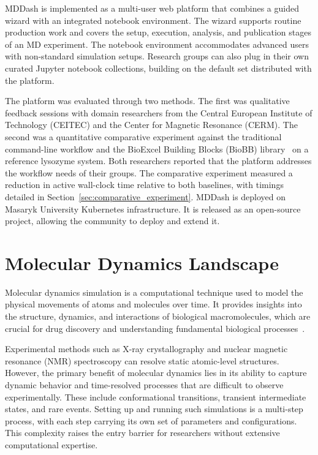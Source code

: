 \documentclass[
  digital,     %
  color,       %
  oneside,     %
  nosansbold,  %
  nocolorbold, %
  lof,         %
  lot,         %
]{fithesis4}
\begin{document}
MDDash is implemented as a multi-user web platform that combines a guided wizard with an integrated notebook environment. The wizard supports routine production work and covers the setup, execution, analysis, and publication stages of an MD experiment. The notebook environment accommodates advanced users with non-standard simulation setups. Research groups can also plug in their own curated Jupyter notebook collections, building on the default set distributed with the platform.

The platform was evaluated through two methods. The first was qualitative feedback sessions with domain researchers from the Central European Institute of Technology (CEITEC) and the Center for Magnetic Resonance (CERM). The second was a quantitative comparative experiment against the traditional command-line workflow and the BioExcel Building Blocks (BioBB) library~\cite{BioBB} on a reference lysozyme system. Both researchers reported that the platform addresses the workflow needs of their groups. The comparative experiment measured a reduction in active wall-clock time relative to both baselines, with timings detailed in Section~\ref{sec:comparative_experiment}. MDDash is deployed on Masaryk University Kubernetes infrastructure. It is released as an open-source project, allowing the community to deploy and extend it.


\chapter{Molecular Dynamics Landscape}
\label{ch:md_landscape}

Molecular dynamics simulation is a computational technique used to model the physical movements of atoms and molecules over time. It provides insights into the structure, dynamics, and interactions of biological macromolecules, which are crucial for drug discovery and understanding fundamental biological processes~\cite{md_for_all}.

Experimental methods such as X-ray crystallography and nuclear magnetic resonance (NMR) spectroscopy can resolve static atomic-level structures. However, the primary benefit of molecular dynamics lies in its ability to capture dynamic behavior and time-resolved processes that are difficult to observe experimentally. These include conformational transitions, transient intermediate states, and rare events. Setting up and running such simulations is a multi-step process, with each step carrying its own set of parameters and configurations. This complexity raises the entry barrier for researchers without extensive computational expertise.
\end{document}
